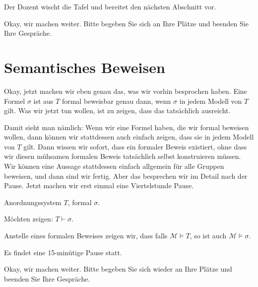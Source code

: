 
\begin{meta-note}[Tafelreinigung]
Der Dozent wischt die Tafel und bereitet den nächsten Abschnitt vor.
\end{meta-note}

\begin{spoken-clean}[00:35:10 - 00:37:10]
Okay, wir machen weiter. Bitte begeben Sie sich an Ihre Plätze und beenden Sie Ihre Gespräche.
\end{spoken-clean}

\section*{Semantisches Beweisen}

\begin{spoken-clean}[00:37:10 - 00:40:05]
Okay, jetzt machen wir eben genau das, was wir vorhin besprochen haben. Eine Formel $\sigma$ ist aus $T$ formal beweisbar genau dann, wenn $\sigma$ in jedem Modell von $T$ gilt. Was wir jetzt tun wollen, ist zu zeigen, dass das tatsächlich ausreicht.

Damit sieht man nämlich: Wenn wir eine Formel haben, die wir formal beweisen wollen, dann können wir stattdessen auch einfach zeigen, dass sie in jedem Modell von $T$ gilt. Dann wissen wir sofort, dass ein formaler Beweis existiert, ohne dass wir diesen mühsamen formalen Beweis tatsächlich selbst konstruieren müssen. Wir können eine Aussage stattdessen einfach allgemein für alle Gruppen beweisen, und dann sind wir fertig. Aber das besprechen wir im Detail nach der Pause. Jetzt machen wir erst einmal eine Viertelstunde Pause.
\end{spoken-clean}

\begin{math-stroke}
Anordnungssystem $T$, formal $\sigma$.

Möchten zeigen: $T \vdash \sigma$.

Anstelle eines formalen Beweises zeigen wir, dass falls $\mathcal{M} \models T$, so ist auch $\mathcal{M} \models \sigma$.
\end{math-stroke}

\begin{lecture-break}[Pause]
Es findet eine 15-minütige Pause statt.
\end{lecture-break}

\begin{spoken-clean}[00:45:10 - 00:47:10]
Okay, wir machen weiter. Bitte begeben Sie sich wieder an Ihre Plätze und beenden Sie Ihre Gespräche.
\end{spoken-clean}

